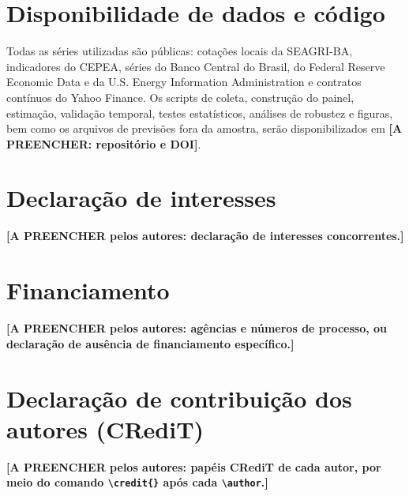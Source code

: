 \documentclass[a4paper,fleqn]{cas-sc}
\begin{document}
\section*{Disponibilidade de dados e código}
Todas as séries utilizadas são públicas: cotações locais da SEAGRI-BA, indicadores do CEPEA, séries do Banco Central do Brasil, do Federal Reserve Economic Data e da U.S. Energy Information Administration e contratos contínuos do Yahoo Finance. Os scripts de coleta, construção do painel, estimação, validação temporal, testes estatísticos, análises de robustez e figuras, bem como os arquivos de previsões fora da amostra, serão disponibilizados em \textbf{[A PREENCHER: repositório e DOI]}.

\section*{Declaração de interesses}
\textbf{[A PREENCHER pelos autores: declaração de interesses concorrentes.]}

\section*{Financiamento}
\textbf{[A PREENCHER pelos autores: agências e números de processo, ou declaração de ausência de financiamento específico.]}

\section*{Declaração de contribuição dos autores (CRediT)}
\textbf{[A PREENCHER pelos autores: papéis CRediT de cada autor, por meio do comando \texttt{\textbackslash credit\{\}} após cada \texttt{\textbackslash author}.]}

\printcredits

%





\end{document}
